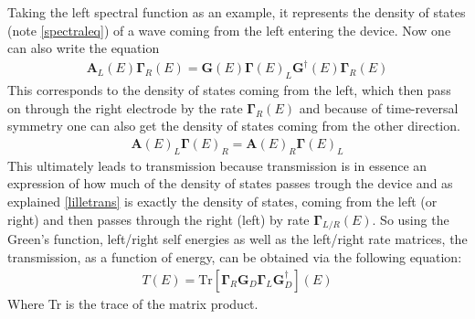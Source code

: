 Taking the left spectral function as an example, it represents the density of states (note \cref{spectraleq}) of a wave coming from the left entering the device. Now one can also write the equation 
\begin{align}\label{lilletrans}
    \mathbf{A}_L(E)\mathbf{\Gamma}_R(E) = \mathbf{G}(E)\mathbf{\Gamma}(E)_L\mathbf{G}^{\dagger}(E)\mathbf{\Gamma}_R(E)
\end{align}
This corresponds to the density of states coming from the left, which then pass on through the right electrode by the rate \(\mathbf{\Gamma}_R(E)\) and because of time-reversal symmetry one can also get the density of states coming from the other direction. 
\begin{align}
    \mathbf{A}(E)_L\mathbf{\Gamma}(E)_R =  \mathbf{A}(E)_R\mathbf{\Gamma}(E)_L
\end{align}
This ultimately leads to transmission because transmission is in essence an expression of how much of the density of states passes trough the device and as explained \cref{lilletrans} is exactly the density of states, coming from the left (or right) and then passes through the right (left) by rate \(\mathbf{\Gamma}_{L/R}(E)\). So using the Green's function, left/right self energies as well as the left/right rate matrices, the transmission, as a function of energy, can be obtained via the following equation:
\begin{align}
    T(E) = \text{Tr}[\mathbf{\Gamma}_R\mathbf{G}_D\mathbf{\Gamma}_L\mathbf{G}_D^{\dagger}](E)
    \label{transeq}
\end{align}
Where Tr is the trace of the matrix product. 

